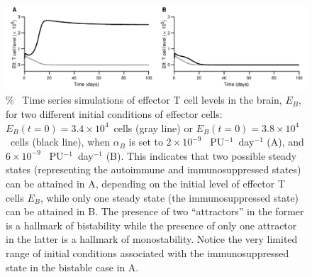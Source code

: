 \begin{figure}[h]
    \centering
    \includegraphics[width=\textwidth]{Figures/Tr1/figS1_bistability.pdf}
    \caption[Bistability in the model]{\%
    ~Time series simulations of effector T cell levels in the brain, $E_B$, for two different initial conditions of effector cells: $E_B (t=0) = 3.4 \times 10^4$~cells (gray line) or $E_B (t=0) = 3.8 \times 10^4$~cells (black line), when $\alpha_B$ is set to $2 \times 10^{-9}$ ~PU$^{-1}$~day$^{-1}$ (A), and $6 \times 10^{-9}$ ~PU$^{-1}$~day$^{-1}$ (B). This indicates that two possible steady states (representing the autoimmune and immunosuppressed states) can be attained in A, depending on the initial level of effector T cells $E_B$, while only one steady state (the immunosuppressed state) can be attained in B. The presence of two ``attractors'' in the former is a hallmark of bistability while the presence of only one attractor in the latter is a hallmark of monostability. Notice the very limited range of initial conditions associated with the immunosuppressed state in the bistable case in A.}
    \label{fig:Tr1_supp_bistability}
\end{figure}

\renewcommand{\thefigure}{\thechapter.\arabic{figure}}
\setcounter{figure}{0}